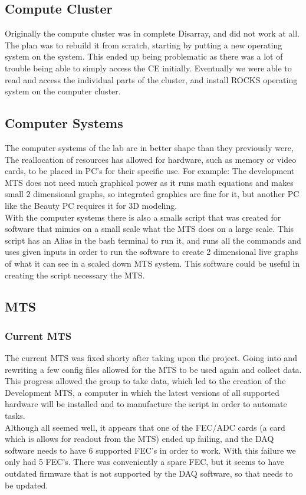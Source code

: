 \documentclass[12pt]{article}
\newcommand\tab[1][1cm]{\hspace*{#1}}
\begin{document}
\subsection{Compute Cluster}
\tab Originally the compute cluster was in complete Disarray, and did not work at all. The plan was to rebuild it from scratch, starting by putting a new operating system on the system. This ended up being problematic as there was a lot of trouble being able to simply access the CE initially. Eventually we were able to read and access the individual parts of the cluster, and install ROCKS operating system on the computer cluster. 
\subsection{Computer Systems}
\tab The computer systems of the lab are in better shape than they previously were, The reallocation of resources has allowed for hardware, such as memory or video cards, to be placed in PC's for their specific use. For example: The development MTS does not need much graphical power as it runs math equations and makes small 2 dimensional graphs, so integrated graphics are fine for it, but another PC like the Beauty PC requires it for 3D modeling. \\
\tab With the computer systems there is also a smalls script that was created for software that mimics on a small scale what the MTS does on a large scale. This script has an Alias in the bash terminal to run it, and runs all the commands and uses given inputs in order to run the software to create 2 dimensional live graphs of what it can see in a scaled down MTS system. This software could be useful in creating the script necessary the MTS.
\subsection{MTS}
\subsubsection{Current MTS}
\tab The current MTS was fixed shorty after taking upon the project. Going into and rewriting a few config files allowed for the MTS to be used again and collect data. This progress allowed the group to take data, which led to the creation of the Development MTS, a computer in which the latest versions of all supported hardware will be installed and to manufacture the script in order to automate tasks. \\
\tab Although all seemed well, it appears that one of the FEC/ADC cards (a card which is allows for readout from the MTS) ended up failing, and the DAQ software needs to have 6 supported FEC's in order to work. With this failure we only had 5 FEC's. There was conveniently a spare FEC, but it seems to have outdated firmware that is not supported by the DAQ software, so that needs to be updated. 
\end{document}

